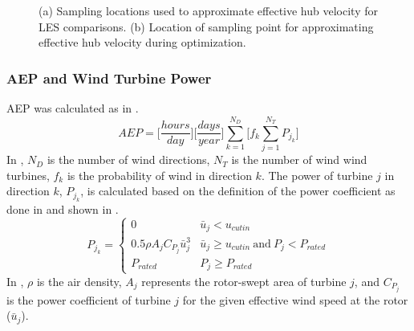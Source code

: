 \documentclass[conf]{new-aiaa}
\begin{document}
\begin{figure}[ht]
	\centering
	\caption{(a) Sampling locations used to approximate effective hub velocity for LES comparisons. (b) Location of sampling point for approximating effective hub velocity during optimization.}
	\label{fig:sampling_locs}
\end{figure}

\subsubsection{AEP and Wind Turbine Power}
AEP was calculated as in .
\begin{equation}
    \label{eq:aep}
    AEP = \bigg[\frac{hours}{day}\bigg]\bigg[\frac{days}{year} \bigg]\sum_{k=1}^{N_D} \bigg[ f_k \sum_{j=1}^{N_T}P_{j_k} \bigg]
\end{equation}
%
In , $N_D$ is the number of wind directions, $N_T$ is the number of wind wind turbines, $f_k$ is the probability of wind in direction $k$. The power of turbine $j$ in direction $k$, $P_{j_k}$, is calculated based on the definition of the power coefficient as done in \cite{gebraad2014} and shown in .
%
\begin{equation}\label{eq:power}
    P_{j_k} = 
    \begin{cases} 
      0 & \bar{u}_j < u_{cutin} \\
      0.5\rho A_j C_{P_j}\bar{u}_j^3 & \bar{u}_j \geq  u_{cutin} \ \text{and} \ P_{j} < P_{rated} \\
      P_{rated} & P_{j} \geq P_{rated}
\end{cases}
\end{equation}
%
In , $\rho$ is the air density, $A_j$ represents the rotor-swept area of turbine $j$, and $C_{P_j}$ is the power coefficient of turbine $j$ for the given effective wind speed at the rotor ($\bar{u}_j$).
\end{document}
